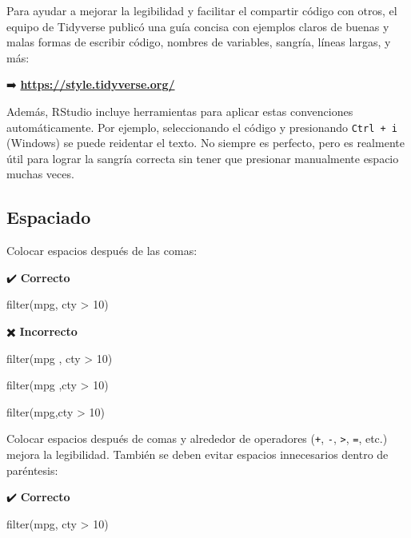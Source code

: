 \documentclass[
  spanish,
  a4paper,
]{scrbook}
\newenvironment{Shaded}{\begin{snugshade}}{\end{snugshade}}
\newcommand{\DecValTok}[1]{\textcolor[rgb]{0.68,0.00,0.00}{#1}}
\newcommand{\FunctionTok}[1]{\textcolor[rgb]{0.28,0.35,0.67}{#1}}
\newcommand{\NormalTok}[1]{\textcolor[rgb]{0.00,0.23,0.31}{#1}}
\newcommand{\SpecialCharTok}[1]{\textcolor[rgb]{0.37,0.37,0.37}{#1}}
\begin{document}
Para ayudar a mejorar la legibilidad y facilitar el compartir código con
otros, el equipo de Tidyverse publicó una guía concisa con ejemplos
claros de buenas y malas formas de escribir código, nombres de
variables, sangría, líneas largas, y más:

➡️
\href{https://style.tidyverse.org/}{\textbf{https://style.tidyverse.org/}}

Además, RStudio incluye herramientas para aplicar estas convenciones
automáticamente. Por ejemplo, seleccionando el código y presionando
\texttt{Ctrl\ +\ i} (Windows) se puede reidentar el texto. No siempre es
perfecto, pero es realmente útil para lograr la sangría correcta sin
tener que presionar manualmente espacio muchas veces.

\subsection{Espaciado}\label{espaciado}

Colocar espacios después de las comas:

✔️ \textbf{Correcto}

\begin{Shaded}
\begin{Highlighting}[]
\FunctionTok{filter}\NormalTok{(mpg, cty }\SpecialCharTok{\textgreater{}} \DecValTok{10}\NormalTok{)}
\end{Highlighting}
\end{Shaded}

✖️ \textbf{Incorrecto}

\begin{Shaded}
\begin{Highlighting}[]
\FunctionTok{filter}\NormalTok{(mpg , cty }\SpecialCharTok{\textgreater{}} \DecValTok{10}\NormalTok{)}

\FunctionTok{filter}\NormalTok{(mpg ,cty }\SpecialCharTok{\textgreater{}} \DecValTok{10}\NormalTok{)}

\FunctionTok{filter}\NormalTok{(mpg,cty }\SpecialCharTok{\textgreater{}} \DecValTok{10}\NormalTok{)}
\end{Highlighting}
\end{Shaded}

Colocar espacios después de comas y alrededor de operadores (\texttt{+},
\texttt{-}, \texttt{\textgreater{}}, \texttt{=}, etc.) mejora la
legibilidad. También se deben evitar espacios innecesarios dentro de
paréntesis:

✔️ \textbf{Correcto}

\begin{Shaded}
\begin{Highlighting}[]
\FunctionTok{filter}\NormalTok{(mpg, cty }\SpecialCharTok{\textgreater{}} \DecValTok{10}\NormalTok{)}
\end{Highlighting}
\end{Shaded}
\end{document}

